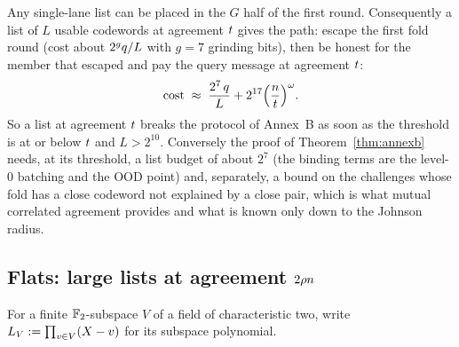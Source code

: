 Any single-lane list can be placed in the $G$ half of the first round. Consequently a list of $L$ usable codewords at agreement $t$ gives the path: escape the first fold round (cost about $2^{g}q/L$ with $g=7$ grinding bits), then be honest for the member that escaped and pay the query message at agreement $t$:
\begin{equation}\label{eq:listcost}
\text{cost}\;\approx\;\frac{2^{7}\,q}{L}+2^{17}\Bigl(\frac{n}{t}\Bigr)^{\omega}.
\end{equation}
So a list at agreement $t$ breaks the protocol of Annex~B as soon as the threshold is at or below $t$ and $L>2^{10}$. Conversely the proof of Theorem~\ref{thm:annexb} needs, at its threshold, a list budget of about $2^7$ (the binding terms are the level-$0$ batching and the OOD point) and, separately, a bound on the challenges whose fold has a close codeword not explained by a close pair, which is what mutual correlated agreement provides and what is known only down to the Johnson radius.

\subsection{Flats: large lists at agreement \texorpdfstring{$2\rho n$}{2 rho n}}\label{sec:flats}

For a finite $\mathbb{F}_2$-subspace $V$ of a field of characteristic two, write $L_V:=\prod_{v\in V}(X-v)$ for its subspace polynomial.

